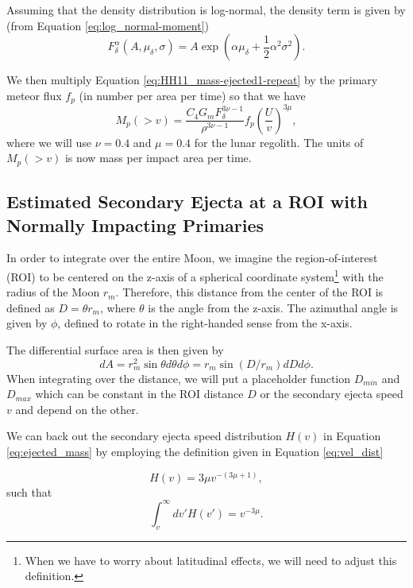 \documentclass{hitec}
\numberwithin{equation}{section}
\begin{document}
Assuming that the density distribution is log-normal, the density term is given by (from Equation \eqref{eq:log_normal-moment})
\begin{equation}\label{eq:log_normal-moment-repeat}
F^\alpha_\delta(A,\mu_\delta,\sigma) = A\exp\left(\alpha\mu_\delta+\frac{1}{2}\alpha^2\sigma^2\right).
\end{equation}

We then multiply Equation \eqref{eq:HH11_mass-ejected1-repeat} by the primary meteor flux $f_p$ (in number per area per time) so that we have
\begin{equation}\label{eq:ejected_mass}
M_p(>v) = \frac{C_4 G_m F_\delta^{3\nu-1}}{\rho^{3\nu-1}}f_p\left(\frac{U}{v}\right)^{3\mu},
\end{equation}
where we will use $\nu = 0.4$ and $\mu = 0.4$ for the lunar regolith. The units of $M_p(>v)$ is now mass per impact area per time.


\subsection{Estimated Secondary Ejecta at a ROI with Normally Impacting Primaries}\label{ssec:EstimatedSecondaryEjectaataROI}
In order to integrate over the entire Moon, we imagine the region-of-interest (ROI) to be centered on the z-axis of a spherical coordinate system\footnote{When we have to worry about latitudinal effects, we will need to adjust this definition.} with the radius of the Moon $r_m$. Therefore, this distance from the center of the ROI is defined as $D = \theta r_m$, where $\theta$ is the angle from the z-axis. The azimuthal angle is given by $\phi$, defined to rotate in the right-handed sense from the x-axis.

The differential surface area is then given by
\begin{equation}
dA = r_m^2\sin\theta d\theta d\phi = r_m\sin(D/r_m)dD d\phi.
\end{equation}
When integrating over the distance, we will put a placeholder function $D_{min}$ and $D_{max}$ which can be constant in the ROI distance $D$ or the secondary ejecta speed $v$ and depend on the other.

We can back out the secondary ejecta speed distribution $H(v)$ in Equation \eqref{eq:ejected_mass} by employing the definition given in Equation \eqref{eq:vel_dist}

\begin{equation}\label{eq:vel_dist-repeat}
H(v) = 3\mu v^{-(3\mu+1)},
\end{equation}
such that
\begin{equation}
\int_{v}^{\infty}dv'H(v') = v^{-3\mu}.
\end{equation}
\end{document}
